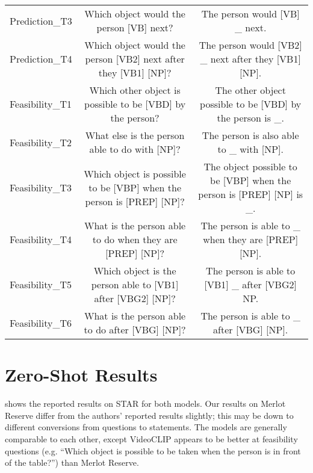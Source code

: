 \begin{landscape}
\begin{table}[t]
\begin{tabular}{lcc}
        Prediction\_T3 & Which object would the person [VB] next? & The person would [VB] \_ next. \\
        Prediction\_T4 & Which object would the person [VB2] next after they [VB1] [NP]? & The person would [VB2] \_ next after they [VB1] [NP]. \\
        \midrule
        Feasibility\_T1 & Which other object is possible to be [VBD] by the person? & The other object possible to be [VBD] by the person is \_. \\
        Feasibility\_T2 & What else is the person able to do with [NP]? & The person is also able to \_ with [NP]. \\
        Feasibility\_T3 & Which object is possible to be [VBP] when the person is [PREP] [NP]? & The object possible to be [VBP] when the person is [PREP] [NP] is \_. \\
        Feasibility\_T4 & What is the person able to do when they are [PREP] [NP]? & The person is able to \_ when they are [PREP] [NP]. \\
        Feasibility\_T5 & Which object is the person able to [VB1] after [VBG2] [NP]? & The person is able to [VB1] \_ after [VBG2] NP. \\
        Feasibility\_T6 & What is the person able to do after [VBG] [NP]? & The person is able to \_ after [VBG] [NP]. \\
        \bottomrule
    \end{tabular}
\end{table}
\end{landscape}
\restoregeometry
\normalsize


\section{Zero-Shot Results}
\label{sec:zs_star}

 shows the reported results on STAR for both models. Our
results on Merlot Reserve differ from the authors' reported results slightly;
this may be down to different conversions from questions to statements. The
models are generally comparable to each other, except VideoCLIP appears to be
better at feasibility questions (e.g. ``Which object is possible to be
taken when the person is in front of the table?'') than Merlot Reserve.

